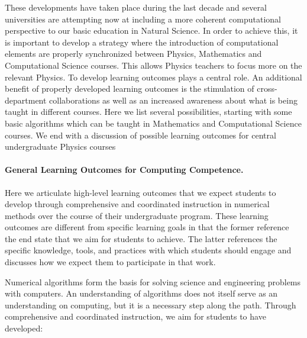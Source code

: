 \documentclass[graybox,envcountchap,sectrefs]{svmult}
\begin{document}
These developments have taken place during the last decade and several universities are attempting now at including a more coherent
computational perspective to our basic education in Natural
Science. In order to achieve this, it is important to develop a
strategy where the introduction of computational elements are properly
synchronized between Physics, Mathematics and Computational Science
courses. This allows Physics teachers to focus more on the relevant
Physics. To develop learning outcomes plays a central role.  An additional benefit of properly developed learning outcomes
is the stimulation of cross-department collaborations as well as an increased awareness about what is being taught in different courses.
Here we
list several possibilities, starting with some basic algorithms which
can be taught in Mathematics and Computational Science courses. We end with a discussion of possible learning outcomes for central undergraduate Physics courses




\paragraph{General Learning Outcomes for Computing Competence.}
Here we articulate high-level learning outcomes that we expect
students to develop through comprehensive and coordinated instruction
in numerical methods over the course of their undergraduate program. These learning outcomes are different from specific
learning goals in that the former reference the end state that we aim
for students to achieve. The latter references the specific knowledge,
tools, and practices with which students should engage and discusses
how we expect them to participate in that work. 

Numerical algorithms form the basis for solving science and engineering problems with computers. An understanding of algorithms does not itself serve as an understanding on computing, but it is a necessary step along the path. Through comprehensive and coordinated instruction, we aim for students to have developed:
\end{document}
